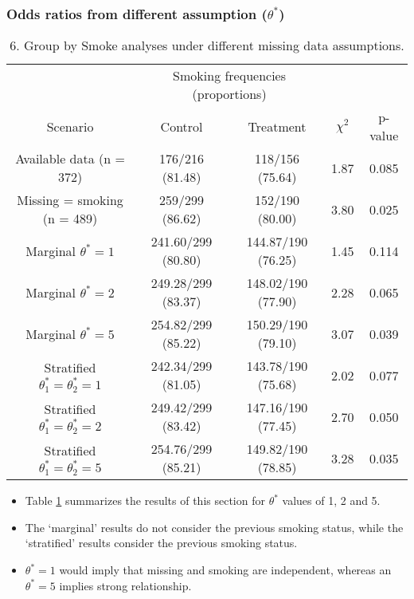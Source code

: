 \documentclass{beamer}
\begin{document}
\begin{frame}
\frametitle{Odds ratios from different assumption ($\theta^*$)}
\begin{table}
\caption{6. Group by Smoke analyses under different missing data assumptions.}\label{tbl5}
\centering
\begin{tabular}{c|cc|cc}\hline\hline
 & \multicolumn{2}{c}{Smoking frequencies (proportions)}&  \\\cline{2-5}
Scenario & Control & Treatment & $\chi^2$ & p-value \\\hline
Available data (n = 372) & 176/216 (81.48) & 118/156 (75.64) & 1.87 & 0.085 \\\hline
Missing = smoking (n = 489) & 259/299 (86.62) & 152/190 (80.00) & 3.80 & 0.025 \\\hline
Marginal $\theta^* = 1$ & 241.60/299 (80.80) & 144.87/190 (76.25) & 1.45 & 0.114 \\\hline
Marginal $\theta^* = 2$ & 249.28/299 (83.37) & 148.02/190 (77.90) & 2.28 & 0.065 \\\hline
Marginal $\theta^* = 5$ & 254.82/299 (85.22) & 150.29/190 (79.10) & 3.07 & 0.039 \\\hline
Stratified $\theta_{1}^* = \theta_{2}^* = 1$ & 242.34/299 (81.05) & 143.78/190 (75.68) & 2.02 & 0.077 \\\hline
Stratified $\theta_{1}^* = \theta_{2}^* = 2$ & 249.42/299 (83.42) & 147.16/190 (77.45) & 2.70 & 0.050 \\\hline
Stratified $\theta_{1}^* = \theta_{2}^* = 5$ & 254.76/299 (85.21) & 149.82/190 (78.85) & 3.28 & 0.035 \\\hline\hline
\end{tabular}
\end{table}
\begin{itemize}
\item Table \ref{tbl5} summarizes the results of this section for $\theta^*$ values of 1, 2 and 5.
\item The ‘marginal’ results do not consider the previous smoking status, while the ‘stratified’ results consider the previous smoking status.
\item $\theta^*= 1$ would imply that missing and smoking are independent, whereas an $\theta^*= 5$ implies strong relationship.
\end{itemize}
\end{frame}
\end{document}
